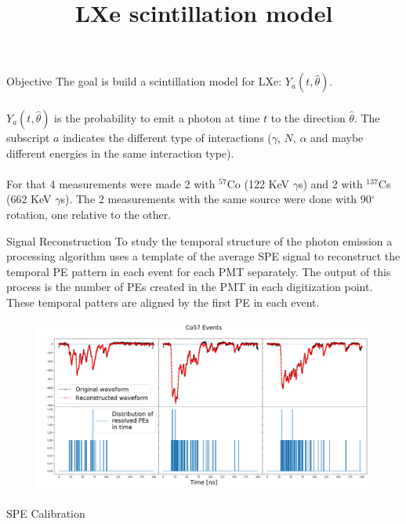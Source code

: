 \documentclass{beamer}
\title{LXe scintillation model}
\begin{document}
{ 
\frame{\titlepage}}

\begin{frame}{Objective}
The goal is build a scintillation model for LXe: $Y_{a}(t,\hat{\theta})$.\\
\quad\\
$Y_{a}(t,\hat{\theta})$ is the probability to emit a photon at time $t$ to the direction $\hat{\theta}$. The subscript $a$ indicates the different type of interactions ($\gamma$, $N$, $\alpha$ and maybe different energies in the same interaction type).\\
\quad\\
For that 4 measurements were made 2 with $^{57}$Co (122 KeV $\gamma$s) and 2 with $^{137}$Cs (662 KeV $\gamma$s). The 2 measurements with the same source were done with 90$^\circ$ rotation, one relative to the other.
\end{frame}


\begin{frame}{Signal Reconstruction}
To study the temporal structure of the photon emission a processing algorithm uses a template of the average SPE signal to reconstruct the temporal PE pattern in each event for each PMT separately. The output of this process is the number of PEs created in the PMT in each digitization point. These temporal patters are aligned by the first PE in each event.

\begin{figure}[h]
\includegraphics[width=1\textwidth]{recons.png}
\end{figure}
\end{frame}

\begin{frame}{SPE Calibration}

\end{frame}
\end{document}
